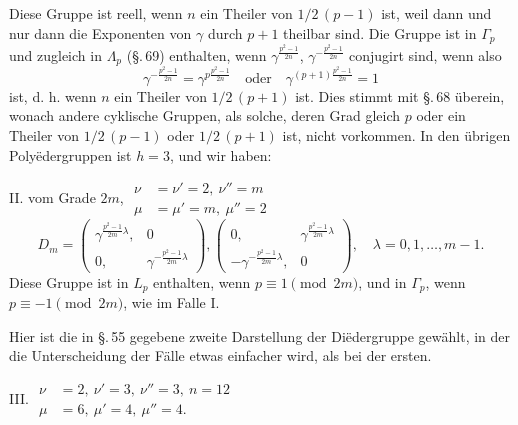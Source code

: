 Diese Gruppe ist reell, wenn $n$ ein Theiler von $1/2\,(p-1)$ ist, weil
dann und nur dann die Exponenten von $\gamma$ durch $p+1$ theilbar
sind. Die Gruppe ist in $\Gamma_p$ und zugleich in $\Lambda_p$ (\S.\,69)
enthalten, wenn $\gamma^{\frac{p^2-1}{2n}}$, $\gamma^{-\frac{p^2-1}{2n}}$
conjugirt sind, wenn also
\[
\gamma^{-\frac{p^2-1}{2n}} = \gamma^{p\frac{p^2-1}{2n}}
\quad \text{oder} \quad
\gamma^{(p+1)\frac{p^2-1}{2n}} = 1
\]
ist, d. h. wenn $n$ ein Theiler von $1/2\,(p+1)$ ist. Dies stimmt mit
\S.\,68 überein, wonach andere cyklische Gruppen, als solche, deren
Grad gleich $p$ oder ein Theiler von $1/2\,(p-1)$ oder $1/2\,(p+1)$
ist, nicht vorkommen. In den übrigen Polyëdergruppen ist $h = 3$, und
wir haben:

II.  vom Grade $2m$,\quad
$\begin{aligned} \nu &= \nu' = 2,\ \nu'' = m \\ \mu &= \mu' = m,\ \mu'' = 2 \end{aligned}$
\[
D_m = \begin{pmatrix} \gamma^{\frac{p^2-1}{2m}\lambda}, & 0 \\[2pt] 0, & \gamma^{-\frac{p^2-1}{2m}\lambda} \end{pmatrix},
\begin{pmatrix} 0, & \gamma^{\frac{p^2-1}{2m}\lambda} \\[2pt] -\gamma^{-\frac{p^2-1}{2m}\lambda}, & 0 \end{pmatrix},
\quad \lambda = 0, 1, \ldots, m-1.
\]
Diese Gruppe ist in $L_p$ enthalten, wenn $p \equiv 1 \pmod{2m}$, und
in $\Gamma_p$, wenn $p \equiv -1 \pmod{2m}$, wie im Falle I.

Hier ist die in \S.\,55 gegebene zweite Darstellung der Diëdergruppe
gewählt, in der die Unterscheidung der Fälle etwas einfacher wird, als
bei der ersten.

III. \quad
$\begin{aligned} \nu &= 2,\ \nu' = 3,\ \nu'' = 3,\ n = 12 \\ \mu &= 6,\ \mu' = 4,\ \mu'' = 4. \end{aligned}$

